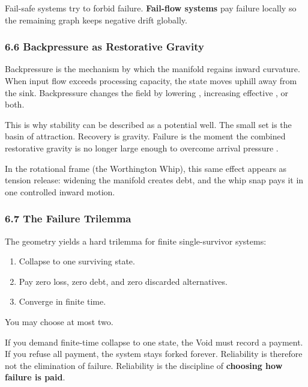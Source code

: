 \documentclass[
]{article}
\providecommand{\tightlist}{%
  \setlength{\itemsep}{0pt}\setlength{\parskip}{0pt}}
\begin{document}
Fail-safe systems try to forbid failure. \textbf{Fail-flow systems} pay
failure locally so the remaining graph keeps negative drift globally.

\subsubsection{\texorpdfstring{\textbf{6.6 Backpressure as Restorative
Gravity}}{6.6 Backpressure as Restorative Gravity}}\label{backpressure-as-restorative-gravity}

Backpressure is the mechanism by which the manifold regains inward
curvature. When input flow exceeds processing capacity, the state moves
uphill away from the sink. Backpressure changes the field by lowering ,
increasing effective , or both.

This is why stability can be described as a potential well. The small
set is the basin of attraction. Recovery is gravity. Failure is the
moment the combined restorative gravity is no longer large enough to
overcome arrival pressure .

In the rotational frame (the Worthington Whip), this same effect appears
as tension release: widening the manifold creates debt, and the whip
snap pays it in one controlled inward motion.

\subsubsection{\texorpdfstring{\textbf{6.7 The Failure
Trilemma}}{6.7 The Failure Trilemma}}\label{the-failure-trilemma}

The geometry yields a hard trilemma for finite single-survivor systems:

\begin{enumerate}
\def\labelenumi{\arabic{enumi}.}
\tightlist
\item
  Collapse to one surviving state.\\
\item
  Pay zero loss, zero debt, and zero discarded alternatives.\\
\item
  Converge in finite time.
\end{enumerate}

You may choose at most two.

If you demand finite-time collapse to one state, the Void must record a
payment. If you refuse all payment, the system stays forked forever.
Reliability is therefore not the elimination of failure. Reliability is
the discipline of \textbf{choosing how failure is paid}.
\end{document}
